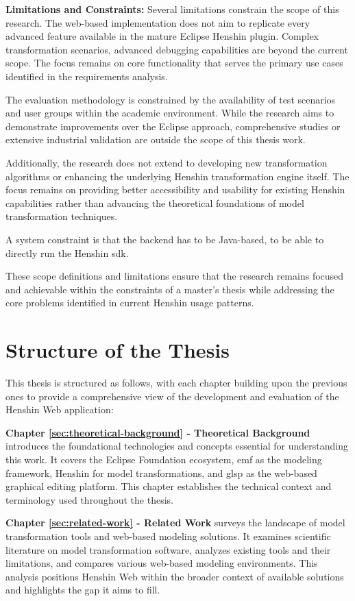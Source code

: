 \textbf{Limitations and Constraints:}
Several limitations constrain the scope of this research. The web-based implementation does not aim to replicate every advanced feature available in the mature Eclipse Henshin plugin. Complex transformation scenarios, advanced debugging capabilities are beyond the current scope. The focus remains on core functionality that serves the primary use cases identified in the requirements analysis.

The evaluation methodology is constrained by the availability of test scenarios and user groups within the academic environment. While the research aims to demonstrate improvements over the Eclipse approach, comprehensive studies or extensive industrial validation are outside the scope of this thesis work.

Additionally, the research does not extend to developing new transformation algorithms or enhancing the underlying Henshin transformation engine itself. The focus remains on providing better accessibility and usability for existing Henshin capabilities rather than advancing the theoretical foundations of model transformation techniques.

A system constraint is that the backend has to be Java-based, to be able to directly run the Henshin \acs{sdk}. 

These scope definitions and limitations ensure that the research remains focused and achievable within the constraints of a master's thesis while addressing the core problems identified in current Henshin usage patterns.

\section{Structure of the Thesis}
\label{subsec:structure-thesis}

This thesis is structured as follows, with each chapter building upon the previous ones to provide a comprehensive view of the development and evaluation of the Henshin Web application:

\textbf{Chapter \ref{sec:theoretical-background} - Theoretical Background} introduces the foundational technologies and concepts essential for understanding this work. It covers the Eclipse Foundation ecosystem, \ac{emf} as the modeling framework, Henshin for model transformations, and \ac{glsp} as the web-based graphical editing platform. This chapter establishes the technical context and terminology used throughout the thesis.

\textbf{Chapter \ref{sec:related-work} - Related Work} surveys the landscape of model transformation tools and web-based modeling solutions. It examines scientific literature on model transformation software, analyzes existing tools and their limitations, and compares various web-based modeling environments. This analysis positions Henshin Web within the broader context of available solutions and highlights the gap it aims to fill.

